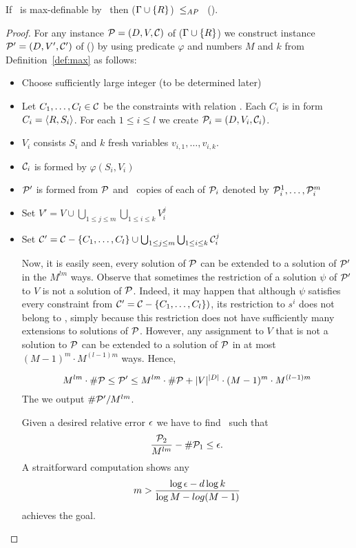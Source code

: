 \begin{theorem}\label{theo:max}
If \mR\ is max-definable by \mrelset\ then \ccsp(\(\Gamma \cup \{{R}\}\))~\(\le_{AP}\)~
\ccsp(\mrelset)\@.

\begin{proof}
For any instance \(\mathcal{P} = (D,V,\mathcal{C})\) of  \ccsp(\(\Gamma \cup \{{R}\}\)) we
construct instance \(\mathcal{P}' = (D, V',\mathcal{C}')\) of  \ccsp(\mrelset) by using 
predicate \(\varphi\) and numbers \(M\) and \(k\) from Definition~\ref{def:max} as follows:
\begin{itemize}
\item 
Choose sufficiently large integer \mm(to be determined later)
\item
Let \(C_1,\dotsc,C_l\in\mathcal{C}\) be the constraints with relation \mR\@. Each \(C_i\) is
in form \(C_i=\langle R,S_i \rangle\)\@. For each \(1\le i \le l\) we create \(\mathcal{P}_i=(D,V_i,\mathcal{C}_i)\)\@.
\item \(V_i\) consists \(S_i\) and \(k\) fresh variables \(v_{i,1},\dotsc,v_{i,k}\)\@.
\item \(\mathcal{C}_i\) is formed by \(\varphi(S_i,V_i)\)
\item \(\mathcal{P}'\) is formed from \(\mathcal{P}\) and \mm\ copies of each of \(\mathcal{P}_i\) denoted by
\(\mathcal{P}^1_i,\dotsc,\mathcal{P}^m_i\)
\item Set \(V'=V \cup \bigcup_{1\le j \le m} \bigcup_{1\le i\le k} V^j_i\)
\item Set \(\mathcal{C}' = \mathcal{C} - \{{C_1,\dotsc,C_l}\} \cup 
\bigcup_{1\le j \le m} \bigcup_{1\le i\le k} \mathcal{C}^j_i\)

Now, it is easily seen, every solution of \(\mathcal{P}\) can be extended to a solution of \(\mathcal{P}'\)
in the \(M^{lm}\) ways. Observe that sometimes the restriction of a solution \(\psi\)
of \(\mathcal{P}'\) to \(V\) is not a solution of \(\mathcal{P}\)\@. Indeed, it may happen that
although \(\psi\) satisfies every constraint from \(\mathcal{C}' = \mathcal{C} - \{{C_1,\dotsc,C_l}\})\),
its restriction to \(s^i\) does not belong to \mR, simply because this restriction does not have
sufficiently many extensions to solutions of \(\mathcal{P}\)\@.
However, any assignment to \(V\) that is not a solution to
\(\mathcal{P}\) can be extended to a solution of \(\mathcal{P}\) in at most \((M-1)^m\cdot M^{(l-1)m}\)
ways. Hence, 

\[M^{lm}\cdot \#\mathcal{P} \le  \mathcal{P}'  
 \le  M^{lm}	\cdot \#\mathcal{P} + |V|^{|D|} \cdot (M-1)^m \cdot M^{(l-1)m} 
 \]
The we output \(\#\mathcal{P}'/M^{lm}\)\@.

Given a desired relative error \(\epsilon\) we have to find \mm\ such that 
\[\frac{\mathcal{P}_2}{M^{lm}} - \#\mathcal{P}_1 \le \epsilon.\]
A straitforward computation shows any 
\[m > \frac{\log \epsilon - d \log k}{\log M - log(M-1)}\]
achieves the goal.


\end{itemize}
\end{proof}


\end{theorem}